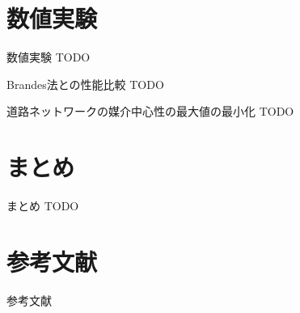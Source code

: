 \documentclass[dvipdfmx,fleqn]{beamer}
\begin{document}
\section{数値実験}
\begin{frame}{数値実験}
  \alert{TODO}
\end{frame}

\begin{frame}{Brandes法との性能比較}
  \alert{TODO}
\end{frame}

\begin{frame}{道路ネットワークの媒介中心性の最大値の最小化}
  \alert{TODO}
\end{frame}

\section{まとめ}
\begin{frame}{まとめ}
  \alert{TODO}
\end{frame}

\appendix
\section{参考文献}
\begin{frame}[allowframebreaks]{参考文献}
  \nocite{01Watts1998}
  \nocite{02Barabasi1999}
  \nocite{03Beauchamp1965}
  \nocite{04Bonacich1991}
  \nocite{05Freeman1977}
  \nocite{06Brandes2001}
  \nocite{07Puzis2012}
  \nocite{08Bentert2018}
  \nocite{09Erdos2015}
  \nocite{10Bader2006}
  \nocite{11Tan2009}
  \nocite{12Edmonds2010}
  \nocite{13Bernaschi2016}
  \nocite{14Brandes2007}
  \nocite{15Bader2007}
  \nocite{16Pfeffer2012}
  \nocite{17Yoshida2014}
  \nocite{18Holme2012}
  \nocite{19Lee2012}
  \nocite{20Singh2015}
  \nocite{21Hayashi2015}
  \nocite{22Bergamini2015a}
  \nocite{23Bergamini2015b}
  \nocite{24Ramalingam1996}
  \nocite{25Kas2013}
  \nocite{26Karger1993}
  \nocite{27Nasre2014a}
  \nocite{28Demetrescu2003}
  \nocite{29Nasre2014b}
  \nocite{30Pontecorvi2015}
  \nocite{31Bergamini2017}
  \nocite{32Leskovec2016}
  \nocite{33Rozemberczki2019b}
  \nocite{34OpenStreetMap}
  \printbibliography[title=]
\end{frame}
\end{document}
